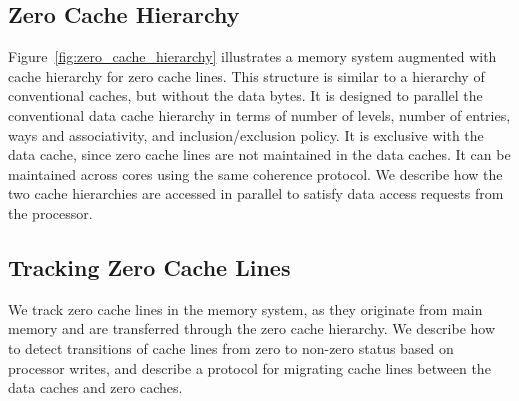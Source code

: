 \subsection{Zero Cache Hierarchy}

Figure~\ref{fig:zero_cache_hierarchy} illustrates a memory system augmented with cache hierarchy for zero cache lines. This structure is similar to a hierarchy of conventional caches, but without the data bytes. It is designed to parallel the conventional data cache hierarchy in terms of number of levels, number of entries, ways and associativity, and inclusion/exclusion policy. It is exclusive with the data cache, since zero cache lines are not maintained in the data caches. It can be maintained across cores using the same coherence protocol.   We describe how the two cache hierarchies are accessed in parallel to satisfy data access requests from the processor. 

\subsection{Tracking Zero Cache Lines}

We track zero cache lines in the memory system, as they originate from main memory and are transferred through the zero cache hierarchy. We describe how to detect transitions of cache lines from zero to non-zero status based on processor writes, and describe a protocol for migrating cache lines between the data caches and zero caches. 

